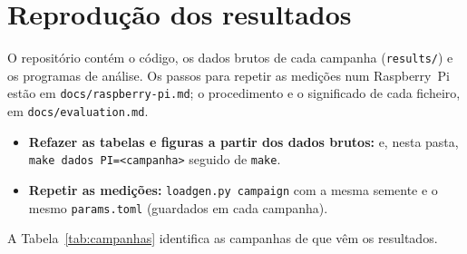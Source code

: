 \section{Reprodução dos resultados}
\label{sec:reproducao}

O repositório contém o código, os dados brutos de cada campanha
(\texttt{results/}) e os programas de análise. Os passos para repetir as medições
num Raspberry~Pi estão em \texttt{docs/raspberry-pi.md}; o procedimento e o
significado de cada ficheiro, em \texttt{docs/evaluation.md}.

\begin{itemize}[leftmargin=*]
  \item \textbf{Refazer as tabelas e figuras a partir dos dados brutos:}
      e, nesta pasta,
    \texttt{make dados PI=<campanha>} \novo{\texttt{[DESKTOP=<campanha>]}} seguido de \texttt{make}.
  \item \textbf{Repetir as medições:} \texttt{loadgen.py campaign} com a mesma
    semente e o mesmo \texttt{params.toml} (guardados em cada campanha).
\end{itemize}

A Tabela~\ref{tab:campanhas} identifica as campanhas de que vêm os resultados.

